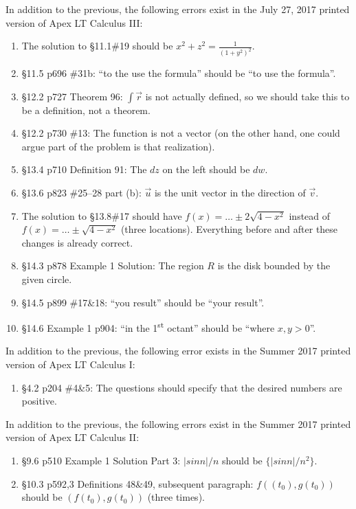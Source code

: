 \documentclass{amsart}
\newcommand{\ds}{\displaystyle}
\begin{document}
In addition to the previous, the following errors exist in the July 27, 2017 printed version of Apex LT Calculus III:
\begin{enumerate}
\item The solution to \S11.1\#19 should be $x^2+z^2=\frac1{(1+y^2)^2}$.
\item \S11.5 p696 \#31b: ``to the use the formula'' should be ``to use the formula''.
\item \S12.2 p727 Theorem 96: $\ds\int\vec r$ is not actually defined, so we should take this to be a definition, not a theorem.
\item \S12.2 p730 \#13: The function is not a vector (on the other hand, one could argue part of the problem is that realization).
\item \S13.4 p710 Definition 91: The $dz$ on the left should be $dw$.
\item \S13.6 p823 \#25--28 part (b): $\vec u$ is the unit vector in the direction of $\vec v$.
\item The solution to \S13.8\#17 should have $f(x)=\dots\pm2\sqrt{4-x^2}$ instead of $f(x)=\dots\pm\sqrt{4-x^2}$ (three locations).  Everything before and after these changes is already correct.
\item \S14.3 p878 Example 1 Solution: The region $R$ is the disk bounded by the given circle.
\item \S14.5 p899 \#17\&18: ``you result'' should be ``your result''.
\item \S14.6 Example 1 p904: ``in the 1\textsuperscript{st} octant'' should be ``where $x,y>0$''.
\label{2017-07-27III}
\end{enumerate}


In addition to the previous, the following error exists in the Summer 2017 printed version of Apex LT Calculus I:
\begin{enumerate}
\item \S4.2 p204 \#4\&5: The questions should specify that the desired numbers are positive.
\label{2017-05-00I}
\end{enumerate}
\vspace{1in}

In addition to the previous, the following errors exist in the Summer 2017 printed version of Apex LT Calculus II:
\begin{enumerate}
\item \S9.6 p510 Example 1 Solution Part 3: $|sin n|/n$ should be $\{|sin n|/n^2\}$.
\item \S10.3 p592,3 Definitions 48\&49, subsequent paragraph: $f((t_0), g(t_0))$ should be $(f(t_0), g(t_0))$ (three times).
\label{2017-05-00II}
\end{enumerate}
\end{document}
